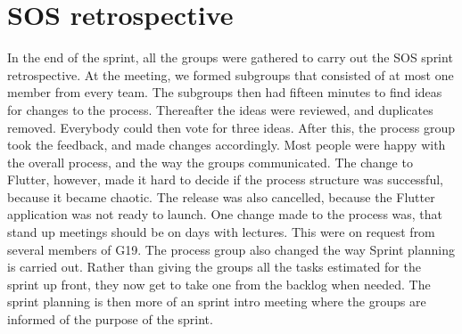 \section{SOS retrospective}
In the end of the sprint, all the groups were gathered to carry out the SOS sprint retrospective. 
At the meeting, we formed subgroups that consisted of at most one member from every team. 
The subgroups then had fifteen minutes to find ideas for changes to the process. 
Thereafter the ideas were reviewed, and duplicates removed. Everybody could then vote for three ideas. 
After this, the process group took the feedback, and made changes accordingly. 
Most people were happy with the overall process, and the way the groups communicated. 
The change to Flutter, however, made it hard to decide if the process structure was successful, because it became chaotic.
The release was also cancelled, because the Flutter application was not ready to launch. 
One change made to the process was, that stand up meetings should be on days with lectures. 
This were on request from several members of G19. 
The process group also changed the way Sprint planning is carried out.
Rather than giving the groups all the tasks estimated for the sprint up front, they now get to take one from the backlog when needed. 
The sprint planning is then more of an sprint intro meeting where the groups are informed of the purpose of the sprint. 
